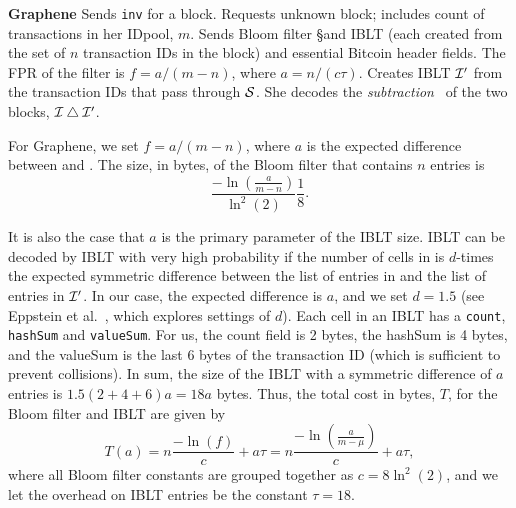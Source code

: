 {\begin{myprot}{\textbf{Graphene}}
\STATE \sender Sends {\tt inv} for a block.
%
\STATE \recvr \hspace{-.1mm}Requests unknown block; includes count of transactions in her IDpool, $m$.
\STATE \sender  Sends Bloom filter \S  and IBLT \I (each created from the set of $n$ transaction IDs in the block) and essential Bitcoin header fields.  The FPR of the filter is $f=a/(m-n)$, where $a=n/(c\tau)$.%
%
\STATE \recvr Creates IBLT $\cal{I}'$ from the transaction IDs that pass through $\cal{S}$. She decodes the {\em subtraction}~\cite{eppstein:2011} of the two blocks, $\cal{I} \bigtriangleup \cal{I'}$.\end{myprot}}

For Graphene, we set $f=a/(m-n)$,
where $a$ is the expected difference between \I and \Ip . The size, in bytes, of the Bloom filter that contains $n$ entries is 
$$\frac{-\ln(\frac{a}{m-n})}{\ln^2(2)}\frac18. $$

It is also the case that $a$ is the primary parameter of the IBLT
size.  IBLT \I can be decoded by IBLT \Ip with very high probability
if the number of cells in \I is $d$-times the expected symmetric
difference between the list of entries in \I and the list of entries
in $\cal{I}'$. In our case, the expected difference is $a$, and we set
$d=1.5$ (see Eppstein et al.~\cite{eppstein:2011}, which explores
settings of $d$). Each cell in an IBLT has a {\tt count}, {\tt hashSum} and
{\tt valueSum}.
For us, the count field is 2 bytes, the
hashSum is 4 bytes, and the valueSum is the last 6 bytes of the
transaction ID (which is sufficient to prevent collisions). In sum,
the size of the IBLT with a symmetric difference of $a$ entries is
$1.5(2+4+6)a=18a$ bytes.
Thus, the total cost in bytes, $T$, for the Bloom filter and IBLT are
given by 
$$T(a)= n\frac{-\ln(f)}{c}+ a\tau = n\frac{-\ln(\frac{a}{m-\mu})}{c}+ a\tau,$$ 
where all Bloom filter constants are grouped together as
$c=8\ln^2(2)$, and we let the overhead on IBLT entries be the constant
$\tau=18$.

